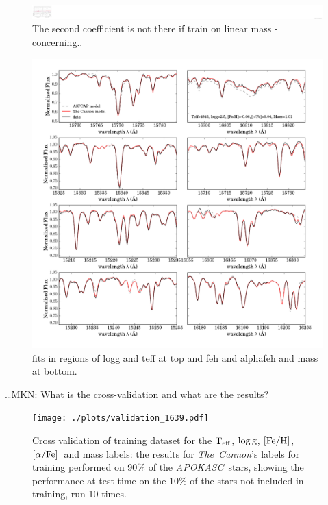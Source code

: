 \documentclass[12pt, preprint]{aastex}
\newcommand{\project}[1]{\textsl{#1}}
\newcommand{\tc}{\project{The~Cannon}}
\newcommand{\apokasc}{\project{APOKASC}}
\newcommand{\teff}{\mbox{$\rm T_{eff}$}}
\newcommand{\feh}{\mbox{$\rm [Fe/H]$}}
\newcommand{\alphafe}{\mbox{$\rm [\alpha/Fe]$}}
\newcommand{\logg}{\mbox{$\rm \log g$}}
\begin{document}
\begin{figure}[p!]
\centering
    \includegraphics[scale=0.51]{./plots/coeffs_m_3.png}
  \caption{The second coefficient is not there if train on linear mass - concerning..}
\label{fig:g}
\end{figure}


\begin{figure}[p!]
\centering
     \includegraphics[scale=0.5]{./plots/spectra_fits_7.png}
  \caption{fits in regions of logg and teff at top and feh and alphafeh and mass at bottom.}
\label{fig:g}
\end{figure}



\ldots MKN: What is the cross-validation and what are the results?
\begin{figure}[p!]
\centering
        \texttt{[image: ./plots/validation\_1639.pdf]}
  \caption{Cross validation of training dataset for the \teff, \logg, \feh, \alphafe\ and mass labels: the results for \tc's labels for training performed on 90\% of the \apokasc\ stars, showing the performance at test time on the 10\% of the stars not included in training, run 10 times.}
\label{fig:validation}
\end{figure}
\end{document}
